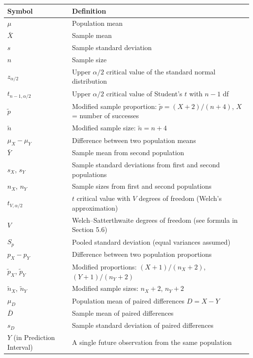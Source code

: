 \documentclass[11pt]{article}
\begin{document}
{\small
\begin{center}
\begin{tabular}{l l}
\toprule
\textbf{Symbol} & \textbf{Definition} \\
\midrule
$\mu$ & Population mean \\
$\bar{X}$ & Sample mean \\
$s$ & Sample standard deviation \\
$n$ & Sample size \\
$z_{\alpha/2}$ & Upper $\alpha/2$ critical value of the standard normal distribution \\
$t_{n-1,\alpha/2}$ & Upper $\alpha/2$ critical value of Student's $t$ with $n-1$ df \\
$\tilde{p}$ & Modified sample proportion: $\tilde{p} = (X+2)/(n+4)$, $X$ = number of successes \\
$\tilde{n}$ & Modified sample size: $\tilde{n} = n+4$ \\
$\mu_X - \mu_Y$ & Difference between two population means \\
$\bar{Y}$ & Sample mean from second population \\
$s_X$, $s_Y$ & Sample standard deviations from first and second populations \\
$n_X$, $n_Y$ & Sample sizes from first and second populations \\
$t_{V,\alpha/2}$ & $t$ critical value with $V$ degrees of freedom (Welch's approximation) \\
$V$ & Welch–Satterthwaite degrees of freedom (see formula in Section 5.6) \\
$S_p$ & Pooled standard deviation (equal variances assumed) \\
$p_X - p_Y$ & Difference between two population proportions \\
$\tilde{p}_X$, $\tilde{p}_Y$ & Modified proportions: $(X+1)/(n_X+2)$, $(Y+1)/(n_Y+2)$ \\
$\tilde{n}_X$, $\tilde{n}_Y$ & Modified sample sizes: $n_X+2$, $n_Y+2$ \\
$\mu_D$ & Population mean of paired differences $D = X-Y$ \\
$\bar{D}$ & Sample mean of paired differences \\
$s_D$ & Sample standard deviation of paired differences \\
$Y$ (in Prediction Interval) & A single future observation from the same population \\
\bottomrule
\end{tabular}
\end{center}
}
\end{document}
